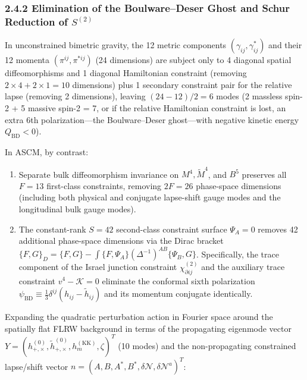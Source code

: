 \documentclass[aps,prd,onecolumn,superscriptaddress,nofootinbib,longbibliography,10pt]{revtex4-2}
\begin{document}
  
\subsubsection*{2.4.2 Elimination of the Boulware–Deser Ghost and Schur Reduction of \(S^{(2)}\)}

  In unconstrained bimetric gravity, the 12 metric components \((\gamma_{ij}, \gamma^*_{ij})\) and their 12 momenta \((\pi^{ij}, \pi^{*ij})\) (24 dimensions) are subject only to 4 diagonal spatial diffeomorphisms and 1 diagonal Hamiltonian constraint (removing \(2 \times 4 + 2 \times 1 = 10\) dimensions) plus 1 secondary constraint pair for the relative lapse (removing 2 dimensions), leaving \((24 - 12)/2 = 6\) modes (2 massless spin-2 + 5 massive spin-2 = 7, or if the relative Hamiltonian constraint is lost, an extra 6th polarization—the Boulware–Deser ghost—with negative kinetic energy \(Q_{\text{BD}} < 0\)).


  In ASCM, by contrast:


  
\begin{enumerate}
    
\item Separate bulk diffeomorphism invariance on \(M^4, \tilde{M}^4\), and \(B^5\) preserves all \(F = 13\) first-class constraints, removing \(2F = 26\) phase-space dimensions (including both physical and conjugate lapse-shift gauge modes and the longitudinal bulk gauge modes).
    
\item The constant-rank \(S = 42\) second-class constraint surface \(\Psi_A = 0\) removes 42 additional phase-space dimensions via the Dirac bracket \(\{F,G\}_D = \{F,G\} - \int \{F,\Psi_A\}(\Delta^{-1})^{AB}\{\Psi_B,G\}\). Specifically, the trace component of the Israel junction constraint \(\chi_{\partial ij}^{(2)}\) and the auxiliary trace constraint \(v^4 - \mathcal{K} = 0\) eliminate the conformal sixth polarization \(\psi_{\text{BD}} \equiv \frac{1}{3}\delta^{ij}(h_{ij} - \tilde{h}_{ij})\) and its momentum conjugate identically.
  
\end{enumerate}

  Expanding the quadratic perturbation action in Fourier space around the spatially flat FLRW background in terms of the propagating eigenmode vector \(Y = (h_{+, \times}^{(0)}, \tilde{h}_{+, \times}^{(0)}, h_m^{(\text{KK})}, \zeta)^T\) (10 modes) and the non-propagating constrained lapse/shift vector \(n = (A, B, A^*, B^*, \delta\mathcal{N}, \delta\mathcal{N}^a)^T\):
\end{document}
